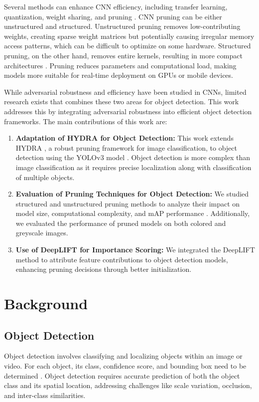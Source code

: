 \documentclass[10pt]{cai}
\begin{document}
Several methods can enhance CNN efficiency, including transfer learning, quantization, weight sharing, and pruning \cite{HABIB20224244}. CNN pruning can be either unstructured and structured. Unstructured pruning removes low-contributing weights, creating sparse weight matrices but potentially causing irregular memory access patterns, which can be difficult to optimize on some hardware. Structured pruning, on the other hand, removes entire kernels, resulting in more compact architectures \cite{beforehydra}. Pruning reduces parameters and computational load, making models more suitable for real-time deployment on GPUs or mobile devices.

While adversarial robustness and efficiency have been studied in CNNs, limited research exists that combines these two areas for object detection. This work addresses this by integrating adversarial robustness into efficient object detection frameworks. The main contributions of this work are:

\begin{enumerate}
    \item \textbf{Adaptation of HYDRA for Object Detection:} This work extends HYDRA \cite{hydra}, a robust pruning framework for image classification, to object detection using the YOLOv3 model \cite{redmon2018yolov3incrementalimprovement}. Object detection is more complex than image classification as it requires precise localization along with classification of multiple objects.
    \item \textbf{Evaluation of Pruning Techniques for Object Detection:} We studied structured and unstructured pruning methods to analyze their impact on model size, computational complexity, and mAP performance \cite{iou}. Additionally, we evaluated the performance of pruned models on both colored and greyscale images.
    \item \textbf{Use of DeepLIFT for Importance Scoring:} We integrated the DeepLIFT method to attribute feature contributions to object detection models, enhancing pruning decisions through better initialization.
\end{enumerate}

\section{Background}
\subsection{Object Detection}
\label{secmAP}
Object detection involves classifying and localizing objects within an image or video. For each object, its class, confidence score, and bounding box need to be determined \cite{8627998}. Object detection requires accurate prediction of both the object class and its spatial location, addressing challenges like scale variation, occlusion, and inter-class similarities.
\end{document}
